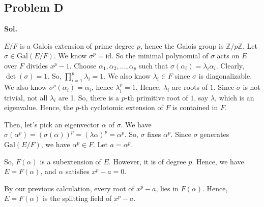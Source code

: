 \documentclass[lang=en,11pt,a4paper,citestyle =authoryear]{elegantpaper}
\begin{document}
\subsection*{Problem D}
\textbf{Sol.} \par
$E/F$ is a Galois extension of prime degree $p$, hence the Galois group is $\mathbb Z/p\mathbb Z$. Let $\sigma\in \text{Gal}(E/F)$.
We know $\sigma^p=\text{id}$. So the minimal polynomial of $\sigma$ acts on $E$ over $F$ divides $x^p-1$. Choose $\alpha_1,\alpha_2,\dots,\alpha_p$ such that $\sigma(\alpha_i)=\lambda_i\alpha_i$. Clearly, $\det(\sigma)=1$. So, $\prod_{i=1}^p\lambda_i=1$. We also know $\lambda_i\in F$ since $\sigma$ is diagonalizable. We also know $\sigma^p(\alpha_i)=\alpha_i$, hence $\lambda_i^p=1$. Hence, $\lambda_i$ are roots of $1$. Since $\sigma$ is not trivial, not all $\lambda_i$ are 1. So, there is a $p$-th primitive root of $1$, say $\lambda$, which is an eigenvalue. Hence, the $p$-th cyclotomic extension of $F$ is contained in $F$.

Then, let's pick an eigenvector $\alpha$ of $\sigma$. We have $\sigma(\alpha^p)=(\sigma(\alpha))^p=(\lambda\alpha)^p=\alpha^p$. So, $\sigma$ fixes $\alpha^p$. Since $\sigma$ generates $\text{Gal}(E/F)$, we have $\alpha^p\in F$. Let $a=\alpha^p$. 

So, $F(\alpha)$ is a subextension of $E$. However, it is of degree $p$. Hence, we have $E=F(\alpha)$, and $\alpha$ satisfies $x^p-a=0$. 

By our previous calculation, every root of $x^p-a$, lies in $F(\alpha)$. Hence, $E=F(\alpha)$ is the splitting field of $x^p-a$.
\par 
\vspace{0.5em}

\addappheadtotoc
\end{document}
